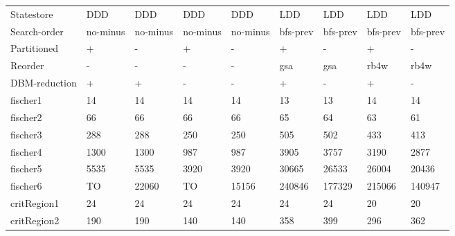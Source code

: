 \begin{table}
\label{fig:nodes_2}
\begin{adjustbox}{max totalheight=\textheight}
    \begin{tabular}{|l|llllllll|}
    \hline
     Statestore        & DDD               & DDD               & DDD               & DDD               & LDD      & LDD      & LDD      & LDD      \\
    Search-order       & no-minus & no-minus & no-minus & no-minus & bfs-prev & bfs-prev & bfs-prev & bfs-prev \\
    Partitioned        & +                 & -                 & +                 & -                 & +        & -        & +        & -        \\
    Reorder            & -                 & -                 & -                 & -                 & gsa      & gsa      & rb4w     & rb4w     \\
    DBM-reduction      & +                 & +                 & -                 & -                 & +        & -        & +        & -        \\ \hline
    fischer1           & 14                & 14                & 14                & 14                & 13       & 13       & 14       & 14       \\
    fischer2           & 66                & 66                & 66                & 66                & 65       & 64       & 63       & 61       \\
    fischer3           & 288               & 288               & 250               & 250               & 505      & 502      & 433      & 413      \\
    fischer4           & 1300              & 1300              & 987               & 987               & 3905     & 3757     & 3190     & 2877     \\
    fischer5           & 5535              & 5535              & 3920              & 3920              & 30665    & 26533    & 26004    & 20436    \\
    fischer6           & TO                & 22060             & TO                & 15156             & 240846   & 177329   & 215066   & 140947   \\ \hline
    critRegion1        & 24                & 24                & 24                & 24                & 24       & 24       & 20       & 20       \\
    critRegion2        & 190               & 190               & 140               & 140               & 358      & 399      & 296      & 362      \\

\end{tabular}
\end{adjustbox}
\end{table}
